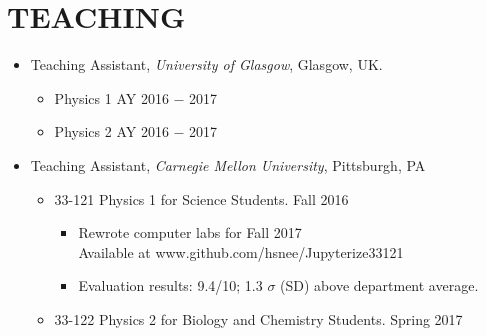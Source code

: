 \section{ \textbf{\color{RoyalBlue}TEACHING}}
\renewcommand\labelitemii{$\square$}
\begin{itemize}
\item Teaching Assistant, {\sl University of Glasgow}, Glasgow, UK.
\begin{itemize}
\item Physics 1 \hfill AY 2016 $-$ 2017
\item Physics 2 \hfill AY 2016 $-$ 2017
\end{itemize}
\item Teaching Assistant, {\sl Carnegie Mellon University}, Pittsburgh, PA
	\begin{itemize}
	\item 33-121 Physics 1 for Science Students. \hfill Fall 2016
		\begin{itemize}
		\item Rewrote computer labs for Fall 2017 \\ Available at www.github.com/hsnee/Jupyterize33121
		\item Evaluation results: 9.4/10; 1.3 $\sigma$ (SD) above department average.
		\end{itemize}
	\item 33-122 Physics 2 for Biology and Chemistry Students. \hfill Spring 2017
	\end{itemize}
\end{itemize}
